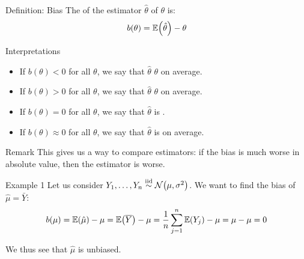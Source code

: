 \documentclass[a4paper]{article}
\begin{document}
\begin{parag}{Definition: Bias}
    The  of the estimator $\hat{\theta}$ of $\theta$ is: 
    \[b\left(\theta\right) = \exval\left(\hat{\theta}\right) - \theta\]
    
    \begin{subparag}{Interpretations}
        \begin{itemize}[left=0pt]
            \item If $b\left(\theta\right) < 0$ for all $\theta$, we say that $\hat{\theta}$  $\theta$ on average. 
            \item If $b\left(\theta\right) > 0$ for all $\theta$, we say that $\hat{\theta}$  $\theta$ on average. 
            \item If $b\left(\theta\right) = 0$ for all $\theta$, we say that $\hat{\theta}$ is . 
            \item If $b\left(\theta\right) \approx 0$ for all $\theta$, we say that $\hat{\theta}$ is  on average. 
        \end{itemize}
    \end{subparag}

    \begin{subparag}{Remark}
        This gives us a way to compare estimators: if the bias is much worse in absolute value, then the estimator is worse. 
    \end{subparag}
\end{parag}

\begin{parag}{Example 1}
    Let us consider $Y_1, \ldots, Y_n \iid \mathcal{N}\left(\mu, \sigma^2\right)$. We want to find the bias of $\hat{\mu} = \bar{Y}$: 
    \[b\left(\mu\right) = \exval\left(\hat{\mu}\right) - \mu = \exval\left(\bar{Y}\right) - \mu = \frac{1}{n}\sum_{j=1}^{n} \exval\left(Y_j\right) - \mu = \mu - \mu = 0\]
    
    We thus see that $\hat{\mu}$ is unbiased.
\end{parag}
\end{document}
